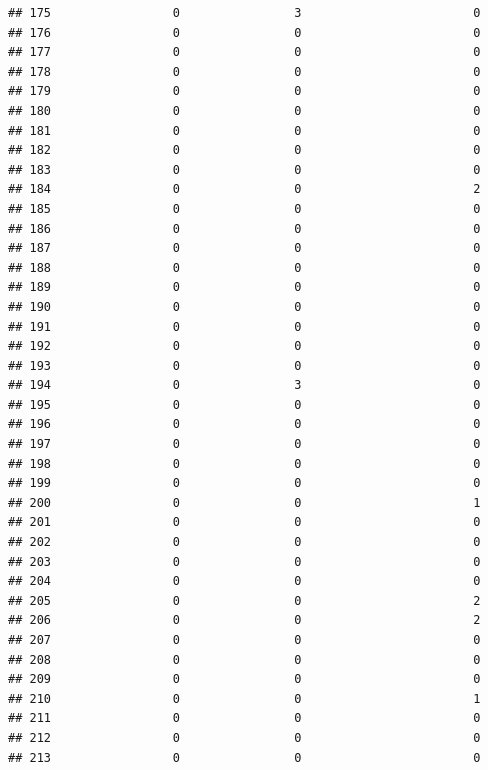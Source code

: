 \documentclass[
]{article}
\begin{document}
\begin{verbatim}
## 175                 0                3                        0
## 176                 0                0                        0
## 177                 0                0                        0
## 178                 0                0                        0
## 179                 0                0                        0
## 180                 0                0                        0
## 181                 0                0                        0
## 182                 0                0                        0
## 183                 0                0                        0
## 184                 0                0                        2
## 185                 0                0                        0
## 186                 0                0                        0
## 187                 0                0                        0
## 188                 0                0                        0
## 189                 0                0                        0
## 190                 0                0                        0
## 191                 0                0                        0
## 192                 0                0                        0
## 193                 0                0                        0
## 194                 0                3                        0
## 195                 0                0                        0
## 196                 0                0                        0
## 197                 0                0                        0
## 198                 0                0                        0
## 199                 0                0                        0
## 200                 0                0                        1
## 201                 0                0                        0
## 202                 0                0                        0
## 203                 0                0                        0
## 204                 0                0                        0
## 205                 0                0                        2
## 206                 0                0                        2
## 207                 0                0                        0
## 208                 0                0                        0
## 209                 0                0                        0
## 210                 0                0                        1
## 211                 0                0                        0
## 212                 0                0                        0
## 213                 0                0                        0

\end{verbatim}
\end{document}
